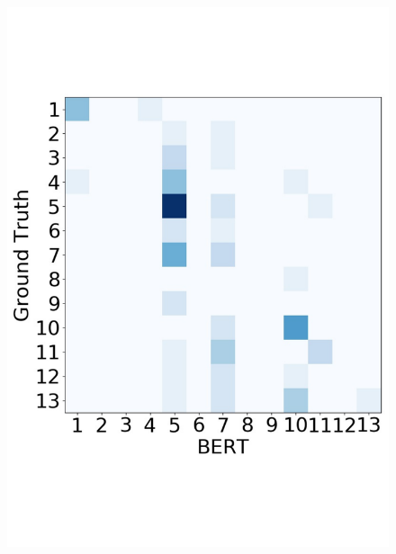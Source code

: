 \begin{figure}
{\begin{minipage}{0.25\linewidth}
			\includegraphics[width=1\linewidth]{BERT_13_pair}\vspace{-1.75cm}

\end{minipage}}
\end{figure}
